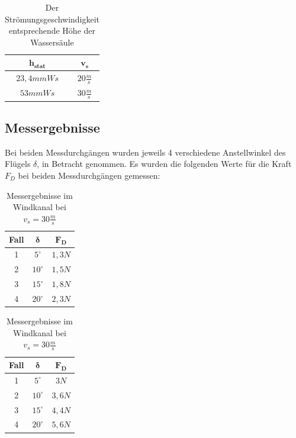 \begin{table}[h]
\centering
\begin{tabular}{|c|c|}
\hline
$\mathbf{h_{stat}}$ & $\mathbf{v_s}$ \\
\hline
$23,4mmWs$ & $20\frac{m}{s}$ \\
$53mmWs$ & $30\frac{m}{s}$ \\
\hline
\end{tabular}
\caption{Der Strömungsgeschwindigkeit entsprechende Höhe der Wassersäule}
\label{tab:wind_tunnel_speed_kokain}
\end{table}

\subsection{Messergebnisse}
\label{subsec:wind_tunnel_results}
Bei beiden Messdurchgängen wurden jeweils 4 verschiedene Anstellwinkel des Flügels $\delta$, in Betracht genommen. Es wurden die folgenden Werte für die Kraft $F_D$ bei beiden Messdurchgängen gemessen:
\begin{table}[H]
\centering
\begin{minipage}{0.49\textwidth}
    \centering
    \begin{tabular}{|c|c|c|}
        \hline
        \textbf{Fall} & $\boldsymbol{\delta}$ & $\mathbf{F_D}$ \\
        \hline
        1 & $5^\circ$ & $1,3N$ \\
        2 & $10^\circ$ & $1,5N$ \\
        3 & $15^\circ$ & $1,8N$ \\
        4 & $20^\circ$ & $2,3N$ \\
        \hline
    \end{tabular}
    \caption {Messergebnisse im Windkanal bei $v_s = 20\frac{m}{s}$}
    \label{tab:wind_tunnel_results_20ms}
    \end{minipage}
    \hfill
    \begin{minipage}{0.49\textwidth}
    \centering
    \begin{tabular}{|c|c|c|}
        \hline
        \textbf{Fall} & $\boldsymbol{\delta}$ & $\mathbf{F_D}$ \\
        \hline
        1 & $5^\circ$ & $3N$ \\
        2 & $10^\circ$ & $3,6N$ \\
        3 & $15^\circ$ & $4,4N$ \\
        4 & $20^\circ$ & $5,6N$ \\
        \hline
    \end{tabular}
    \caption{Messergebnisse im Windkanal bei $v_s = 30\frac{m}{s}$}
    \label{tab:wind_tunnel_results_30ms}
    \end{minipage}
\end{table}

